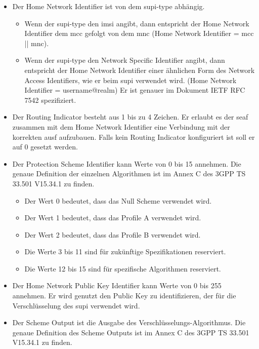 \begin{itemize}
\item Der Home Network Identifier ist von dem \gls{supi-type} abhängig.
\begin{itemize}
\item Wenn der \gls{supi-type} den \gls{imsi} angibt, dann entspricht der Home Network Identifier dem \gls{mcc} gefolgt von dem \gls{mnc} (Home Network Identifier = \gls{mcc} || \gls{mnc}). 
\item Wenn der \gls{supi-type} den Network Specific Identifier angibt, dann entspricht der Home Network Identifier einer ähnlichen Form des Network Access Identifiers, wie er beim \gls{supi} verwendet wird. (Home Network Identifier = username@realm)
Er ist genauer im Dokument IETF RFC 7542 spezifiziert. %
\end{itemize}
\item Der Routing Indicator besteht aus 1 bis zu 4 Zeichen. %
Er erlaubt es der \gls{seaf} zusammen mit dem Home Network Identifier eine Verbindung mit der korrekten \gls{ausf} aufzubauen.
Falls kein Routing Indicator konfiguriert ist soll er auf 0 gesetzt werden.
\item Der Protection Scheme Identifier kann Werte von 0 bis 15 annehmen.
Die genaue Definition der einzelnen Algorithmen ist im Annex C des 3GPP TS 33.501 V15.34.1 zu finden. %
\begin{itemize}
\item Der Wert 0 bedeutet, dass das Null Scheme verwendet wird.
\item Der Wert 1 bedeutet, dass das Profile A verwendet wird.
\item Der Wert 2 bedeutet, dass das Profile B verwendet wird.
\item Die Werte 3 bis 11 sind für zukünftige Spezifikationen reserviert.
\item Die Werte 12 bis 15 sind für spezifische Algorithmen reserviert.
\end{itemize}
\item Der Home Network Public Key Identifier kann Werte von 0 bis 255 annehmen.
Er wird genutzt den Public Key zu identifizieren, der für die Verschlüsselung des \gls{supi} verwendet wird.
\item Der Scheme Output ist die Ausgabe des Verschlüsselungs-Algorithmus.
Die genaue Definition des Scheme Outputs ist im Annex C des 3GPP TS 33.501 V15.34.1 zu finden. %
\end{itemize}

